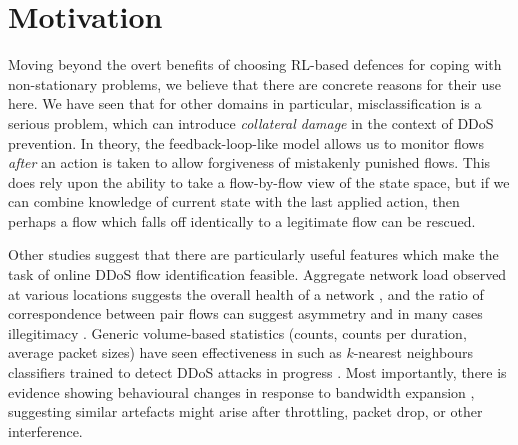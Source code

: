 \section{Motivation}\label{sec:ddos-motivation}
Moving beyond the overt benefits of choosing RL-based defences for coping with non-stationary problems, we believe that there are concrete reasons for their use here.
We have seen that for other domains in particular, misclassification is a serious problem, which can introduce \emph{collateral damage} in the context of DDoS prevention.
In theory, the feedback-loop-like model allows us to monitor flows \emph{after} an action is taken to allow forgiveness of mistakenly punished flows.
This does rely upon the ability to take a flow-by-flow view of the state space, but if we can combine knowledge of current state with the last applied action, then perhaps a flow which falls off identically to a legitimate flow can be rescued.

Other studies suggest that there are particularly useful features which make the task of online DDoS flow identification feasible.
Aggregate network load observed at various locations suggests the overall health of a network \cite{DBLP:journals/eaai/MalialisK15}, and the ratio of correspondence between pair flows can suggest asymmetry and in many cases illegitimacy \cite{DBLP:conf/ndss/Rossow14}.
Generic volume-based statistics (counts, counts per duration, average packet sizes) have seen effectiveness in such as $k$-nearest neighbours classifiers trained to detect DDoS attacks in progress \cite{DBLP:conf/dsn/LeeKSPY17}.
Most importantly, there is evidence showing behavioural changes in response to bandwidth expansion \cite{DBLP:conf/ndss/KangGS16}, suggesting similar artefacts might arise after throttling, packet drop, or other interference.

